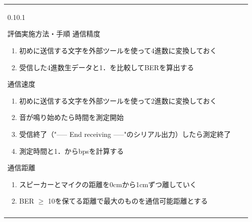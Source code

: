 \documentclass[a4j,11pt,dvipdfmx]{jsarticle}
\makeatletter
\renewcommand{\subsection}{%
    \@startsection{subsection}{1}{\z@}%
    {0.1\Cvs}{0.1\Cvs}%
    {\normalfont\headfont\raggedright}}
\newcommand{\bhline}{\noalign{\hrule height 1pt}}
\makeatother
\begin{document}
\begin{table}[H]
\begin{tabular}{bp{}b}
\subsection{評価実施方法・手順}
通信精度
\begin{enumerate}
    \item 初めに送信する文字を外部ツールを使って4進数に変換しておく
    \item 受信した4進数生データと1．を比較してBERを算出する
\end{enumerate}
通信速度
\begin{enumerate}
    \item 初めに送信する文字を外部ツールを使って2進数に変換しておく
    \item 音が鳴り始めたら時間を測定開始
    \item 受信終了（"----- End receiving -----"のシリアル出力）したら測定終了
    \item 測定時間と1．からbpsを計算する
\end{enumerate}
通信距離
\begin{enumerate}
    \item スピーカーとマイクの距離を0cmから1cmずつ離していく
    \item BER $\geq$ 10を保てる距離で最大のものを通信可能距離とする
\end{enumerate}
\\ \bhline

\end{tabular}
\end{table}

\end{document}
